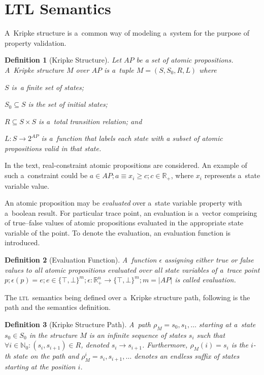 \documentclass[12pt,twoside,draft]{fithesis}
\newcommand{\ltl}{\textsc{ltl}~}
\newcommand{\mReal}{\mathbb{R}}
\newcommand{\mNatural}{\mathbb{N}}
\newtheorem{mydef}{Definition}
\begin{document}
\section{LTL Semantics}
A~Kripke structure is a~common way of modeling a~system for the purpose
of property validation\cite{clarke}.
\begin{mydef}[Kripke Structure]
Let ${AP}$ be a set of atomic propositions.
A~Kripke structure\cite{clarke} $M$ over $AP$ is a~tuple
$M=(S, S_0, R, L)$ where
\begin{inparaenum}
	\item{}$S$ is~a finite set of states;
	\item{}$S_0\subseteq{}S$ is the set of initial states;
	\item{}$R\subseteq{}S\times{}S$ is a~total transition relation; and
	\item{}$L:S\rightarrow{}2^{AP}$ is a~function that labels each state
		with a subset of atomic propositions valid in that state.
\end{inparaenum}
\end{mydef}
In the text, real-constraint atomic propositions are considered.
An example of such a~constraint could be
$a\in AP;a\equiv x_i \geq c;c\in\mReal_{+}$, where $x_i$ represents
a~state variable value.

An atomic proposition may be \emph{evaluated}
over a~state variable property with a~boolean result. For particular
trace point, an evaluation is a~vector comprising of true--false values
of atomic propositions evaluated in the appropriate state variable of
the point. To denote the evaluation, an evaluation function is
introduced.
\begin{mydef}[Evaluation Function]
A~function $\epsilon$ assigning either true or false values to
all atomic propositions evaluated over all state variables of a~trace
point $p;\epsilon(p)=e;e\in\{\top,\bot\}^m; \epsilon:\mReal_{+}^n
\rightarrow\{\top,\bot\}^m;m=|AP|$ is called evaluation.
\end{mydef}

The \ltl semantics being defined over a~Kripke structure
path\cite{clarke}, following is the path and the semantics definition.
\begin{mydef}[Kripke Structure Path]
A~path $\rho_M=s_0,s_1,\dotsc$ starting at a~state
$s_0\in S_0$ in the structure $M$ is an infinite sequence of states
$s_i$ such that $\forall i \in \mNatural_0: (s_i, s_{i+1}) \in R$,
denoted $s_i\rightarrow s_{i+1}$. 
Furthermore, $\rho_M(i)=s_i$ is the $i$-th state on the path and
$\rho_M^i=s_i,s_{i+1},\dotsc$ denotes an endless suffix of states
starting at the position $i$.
\end{mydef}
\end{document}

